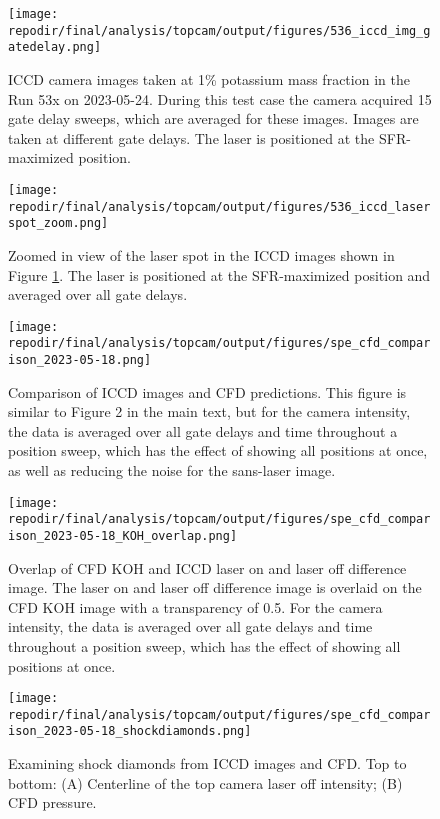 \begin{figure}
    \centering
    \texttt{[image: \\repodir/final/analysis/topcam/output/figures/536\_iccd\_img\_gatedelay.png]} 
    \caption{ICCD camera images taken at 1\% potassium mass fraction in the Run 53x on 2023-05-24. During this test case the camera acquired 15 gate delay sweeps, which are averaged for these images. Images are taken at different gate delays. The laser is positioned at the SFR-maximized position. }
    \label{fig:SI_536_iccd}
\end{figure}


\begin{figure}
    \centering
    \texttt{[image: \\repodir/final/analysis/topcam/output/figures/536\_iccd\_laserspot\_zoom.png]} 
    \caption{Zoomed in view of the laser spot in the ICCD images shown in Figure \ref{fig:SI_536_iccd}. The laser is positioned at the SFR-maximized position and averaged over all gate delays.}
    \label{fig:SI_536_iccd_laserspot_zoom}
\end{figure}


\begin{figure}[]
\centering
\texttt{[image: \\repodir/final/analysis/topcam/output/figures/spe\_cfd\_comparison\_2023-05-18.png]}
\caption{Comparison of ICCD images and CFD predictions. This figure is similar to Figure 2 in the main text, but for the camera intensity, the data is averaged over all gate delays and time throughout a position sweep, which has the effect of showing all positions at once, as well as reducing the noise for the sans-laser image.}
\label{fig:SI_iccd_cfd_comparison}
\end{figure}


\begin{figure}[]
\centering
\texttt{[image: \\repodir/final/analysis/topcam/output/figures/spe\_cfd\_comparison\_2023-05-18\_KOH\_overlap.png]}
\caption{Overlap of CFD KOH and ICCD laser on and laser off difference image. The laser on and laser off difference image is overlaid on the CFD KOH image with a transparency of 0.5. For the camera intensity, the data is averaged over all gate delays and time throughout a position sweep, which has the effect of showing all positions at once.}
\label{fig:SI_iccd_cfd_comparison_KOH_overlap}
\end{figure}

\begin{figure}
    \centering
    \texttt{[image: \\repodir/final/analysis/topcam/output/figures/spe\_cfd\_comparison\_2023-05-18\_shockdiamonds.png]} 
    \caption{Examining shock diamonds from ICCD images and CFD. Top to bottom: (A) Centerline of the top camera laser off intensity; (B) CFD pressure.}
    \label{fig:SI_iccd_cfd_comparison_KOH}
\end{figure}

